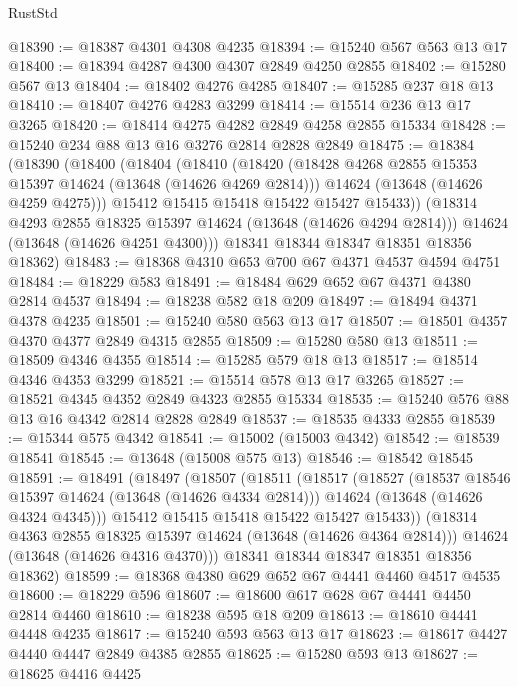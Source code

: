 \begin{lexlean}{RustStd}
\begin{coremodule}
@18390 := @18387 @4301 @4308 @4235
@18394 := @15240 @567 @563 @13 @17
@18400 := @18394 @4287 @4300 @4307 @2849 @4250 @2855
@18402 := @15280 @567 @13
@18404 := @18402 @4276 @4285
@18407 := @15285 @237 @18 @13
@18410 := @18407 @4276 @4283 @3299
@18414 := @15514 @236 @13 @17 @3265
@18420 := @18414 @4275 @4282 @2849 @4258 @2855 @15334
@18428 := @15240 @234 @88 @13 @16 @3276 @2814 @2828 @2849
@18475 := @18384
    (@18390
      (@18400
        (@18404
          (@18410
            (@18420
              (@18428 @4268 @2855 @15353 @15397 @14624 (@13648 (@14626 @4269 @2814)))
              @14624
              (@13648 (@14626 @4259 @4275)))
            @15412
            @15415
            @15418
            @15422
            @15427
            @15433))
        (@18314 @4293 @2855 @18325 @15397 @14624 (@13648 (@14626 @4294 @2814)))
        @14624
        (@13648 (@14626 @4251 @4300)))
      @18341
      @18344
      @18347
      @18351
      @18356
      @18362)
@18483 := @18368 @4310 @653 @700 @67 @4371 @4537 @4594 @4751
@18484 := @18229 @583
@18491 := @18484 @629 @652 @67 @4371 @4380 @2814 @4537
@18494 := @18238 @582 @18 @209
@18497 := @18494 @4371 @4378 @4235
@18501 := @15240 @580 @563 @13 @17
@18507 := @18501 @4357 @4370 @4377 @2849 @4315 @2855
@18509 := @15280 @580 @13
@18511 := @18509 @4346 @4355
@18514 := @15285 @579 @18 @13
@18517 := @18514 @4346 @4353 @3299
@18521 := @15514 @578 @13 @17 @3265
@18527 := @18521 @4345 @4352 @2849 @4323 @2855 @15334
@18535 := @15240 @576 @88 @13 @16 @4342 @2814 @2828 @2849
@18537 := @18535 @4333 @2855
@18539 := @15344 @575 @4342
@18541 := @15002 (@15003 @4342)
@18542 := @18539 @18541
@18545 := @13648 (@15008 @575 @13)
@18546 := @18542 @18545
@18591 := @18491
    (@18497
      (@18507
        (@18511
          (@18517
            (@18527
              (@18537 @18546 @15397 @14624 (@13648 (@14626 @4334 @2814)))
              @14624
              (@13648 (@14626 @4324 @4345)))
            @15412
            @15415
            @15418
            @15422
            @15427
            @15433))
        (@18314 @4363 @2855 @18325 @15397 @14624 (@13648 (@14626 @4364 @2814)))
        @14624
        (@13648 (@14626 @4316 @4370)))
      @18341
      @18344
      @18347
      @18351
      @18356
      @18362)
@18599 := @18368 @4380 @629 @652 @67 @4441 @4460 @4517 @4535
@18600 := @18229 @596
@18607 := @18600 @617 @628 @67 @4441 @4450 @2814 @4460
@18610 := @18238 @595 @18 @209
@18613 := @18610 @4441 @4448 @4235
@18617 := @15240 @593 @563 @13 @17
@18623 := @18617 @4427 @4440 @4447 @2849 @4385 @2855
@18625 := @15280 @593 @13
@18627 := @18625 @4416 @4425

\end{coremodule}
\end{lexlean}
